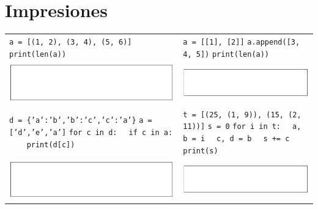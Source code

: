 \section{Impresiones}

\begin{center}
	\begin{tabular}{p{8cm} p{8cm}}
        \texttt{a = [(1, 2), (3, 4), (5, 6)]} \newline \texttt{print(len(a))}& \texttt{a = [[1], [2]]} \newline \texttt{a.append([3, 4, 5])} \newline \texttt{print(len(a))} \\
        \includegraphics[scale=0.8]{Imagenes/rectangulo} & \includegraphics[scale=0.8]{Imagenes/rectangulo}\\
        \texttt{d = \{'a':'b','b':'c','c':'a'\}} \newline \texttt{a = ['d','e','a']} \newline \texttt{for c in d:} \newline \texttt{\-\ \-\ if c in a:} \newline \texttt{\-\ \-\ \-\ \-\ print(d[c])} & \texttt{t = [(25, (1, 9)), (15, (2, 11))]} \newline \texttt{s = 0}   \newline \texttt{for i in t:}  \newline \texttt{\-\ \-\ a, b = i}  \newline \texttt{\-\ \-\ c, d = b}  \newline \texttt{\-\ \-\ s += c} \newline \texttt{print(s)}\\
        \includegraphics[scale=0.8]{Imagenes/rectangulo} & \includegraphics[scale=0.8]{Imagenes/rectangulo}\\

\end{tabular}
\end{center}
